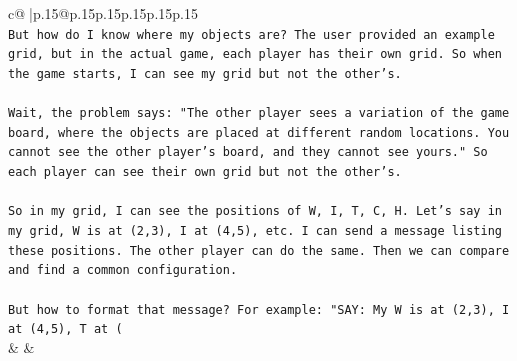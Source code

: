 \documentclass{article}
\begin{document}
{\begin{supertabular}{c@{$\;$}|p{.15\linewidth}@{}p{.15\linewidth}p{.15\linewidth}p{.15\linewidth}p{.15\linewidth}p{.15\linewidth}}
{{{\\ 
\texttt{But how do I know where my objects are? The user provided an example grid, but in the actual game, each player has their own grid. So when the game starts, I can see my grid but not the other's. } \\
\\ 
\texttt{Wait, the problem says: "The other player sees a variation of the game board, where the objects are placed at different random locations. You cannot see the other player's board, and they cannot see yours." So each player can see their own grid but not the other's. } \\
\\ 
\texttt{So in my grid, I can see the positions of W, I, T, C, H. Let's say in my grid, W is at (2,3), I at (4,5), etc. I can send a message listing these positions. The other player can do the same. Then we can compare and find a common configuration. } \\
\\ 
\texttt{But how to format that message? For example: "SAY: My W is at (2,3), I at (4,5), T at (} \\
            }
        }
    }
    & & \\ \\


\end{supertabular}}
\end{document}
